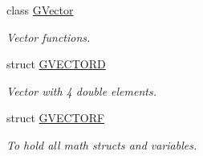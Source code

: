 \begin{DoxyCompactItemize}
class \hyperlink{classGW_1_1MATH_1_1GVector}{G\+Vector}
\begin{DoxyCompactList}\small\item\em Vector functions. \end{DoxyCompactList}\item 
struct \hyperlink{structGW_1_1MATH_1_1GVECTORD}{G\+V\+E\+C\+T\+O\+RD}
\begin{DoxyCompactList}\small\item\em Vector with 4 double elements. \end{DoxyCompactList}\item 
struct \hyperlink{structGW_1_1MATH_1_1GVECTORF}{G\+V\+E\+C\+T\+O\+RF}
\begin{DoxyCompactList}\small\item\em To hold all math structs and variables. \end{DoxyCompactList}\end{DoxyCompactItemize}
